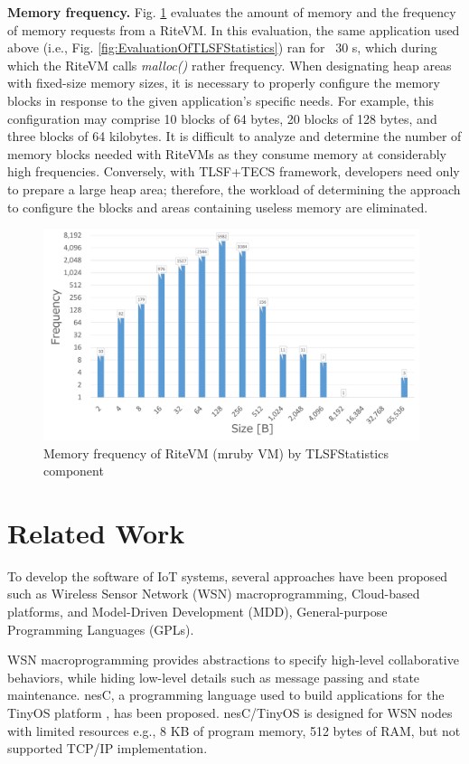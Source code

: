 \documentclass[a4j,12pt,oneside,openany,english]{jsbook}
\begin{document}
{\bf Memory frequency.}
Fig. \ref{fig:EvaluationOfTLSFFrequency} evaluates the amount of memory and the frequency of memory requests from a RiteVM.
In this evaluation, the same application used above (i.e., Fig. \ref{fig:EvaluationOfTLSFStatistics}) ran for ~30 s, which during which the RiteVM calls {\it malloc()} rather frequency.
When designating heap areas with fixed-size memory sizes, it is necessary to properly configure the memory blocks in response to the given application's specific needs.
For example, this configuration may comprise 10 blocks of 64 bytes, 20 blocks of 128 bytes, and three blocks of 64 kilobytes.
It is difficult to analyze and determine the number of memory blocks needed with RiteVMs as they consume memory at considerably high frequencies.
Conversely, with TLSF+TECS framework, developers need only to prepare a large heap area; therefore, the workload of determining the approach to configure the blocks and areas containing useless memory are eliminated.

\begin{figure}[t]
    \centering
    \includegraphics[width=11cm,clip]{figure/EvaluationOfTLSFFrequency.pdf}
    \caption{Memory frequency of RiteVM (mruby VM) by TLSFStatistics component}
    \label{fig:EvaluationOfTLSFFrequency}
\end{figure}


\chapter{Related Work}
\label{sec:Related Work}

To develop the software of IoT systems, several approaches have been proposed \cite{par:frameworkCPS} such as Wireless Sensor Network (WSN) macroprogramming, Cloud-based platforms, and Model-Driven Development (MDD), General-purpose Programming Languages (GPLs).

WSN macroprogramming provides abstractions to specify high-level collaborative behaviors, while hiding low-level details such as message passing and state maintenance.
nesC, a programming language used to build applications for the TinyOS platform \cite{par:nesc}, has been proposed.
nesC/TinyOS is designed for WSN nodes with limited resources e.g., 8 KB of program memory, 512 bytes of RAM, but not supported TCP/IP implementation.
\end{document}
